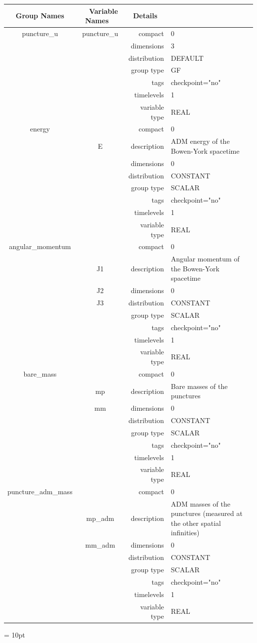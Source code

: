 \begin{tabular*}{150mm}{|c|c@{\extracolsep{\fill}}|rl|} \hline 
~ {\bf Group Names} ~ & ~ {\bf Variable Names} ~  &{\bf Details} ~ & ~\\ 
\hline 
puncture\_u & puncture\_u & compact & 0 \\ 
 &  & dimensions & 3 \\ 
 &  & distribution & DEFAULT \\ 
 &  & group type & GF \\ 
 &  & tags & checkpoint="no" \\ 
 &  & timelevels & 1 \\ 
 &  & variable type & REAL \\ 
\hline 
energy &  & compact & 0 \\ 
 & E & description & ADM energy of the Bowen-York spacetime \\ 
 &  & dimensions & 0 \\ 
 &  & distribution & CONSTANT \\ 
 &  & group type & SCALAR \\ 
 &  & tags & checkpoint="no" \\ 
 &  & timelevels & 1 \\ 
 &  & variable type & REAL \\ 
\hline 
angular\_momentum &  & compact & 0 \\ 
 & J1 & description & Angular momentum of the Bowen-York spacetime \\ 
 & J2 & dimensions & 0 \\ 
 & J3 & distribution & CONSTANT \\ 
 &  & group type & SCALAR \\ 
 &  & tags & checkpoint="no" \\ 
 &  & timelevels & 1 \\ 
 &  & variable type & REAL \\ 
\hline 
bare\_mass &  & compact & 0 \\ 
 & mp & description & Bare masses of the punctures \\ 
 & mm & dimensions & 0 \\ 
 &  & distribution & CONSTANT \\ 
 &  & group type & SCALAR \\ 
 &  & tags & checkpoint="no" \\ 
 &  & timelevels & 1 \\ 
 &  & variable type & REAL \\ 
\hline 
puncture\_adm\_mass &  & compact & 0 \\ 
 & mp\_adm & description & ADM masses of the punctures (measured at the other spatial infinities) \\ 
 & mm\_adm & dimensions & 0 \\ 
 &  & distribution & CONSTANT \\ 
 &  & group type & SCALAR \\ 
 &  & tags & checkpoint="no" \\ 
 &  & timelevels & 1 \\ 
 &  & variable type & REAL \\ 
\hline 
\end{tabular*} 



\vspace{5mm}\parskip = 10pt 
